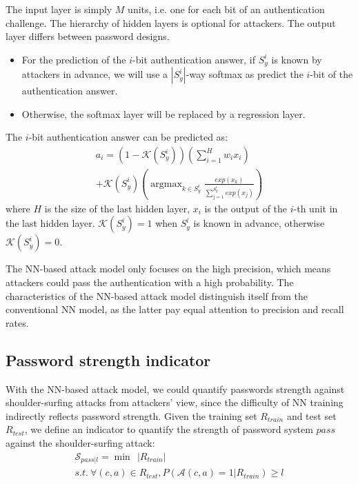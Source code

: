 \documentclass{article}
\begin{document}
The input layer is simply $M$ units, i.e. one for each bit of an authentication challenge. The hierarchy of hidden layers is optional for attackers. The output layer differs between password designs.
\begin{itemize} 
  \item For the prediction of the $i$-bit authentication answer, if $S_y^i$ is known by attackers in advance, we will use a $|S_y^i|$-way softmax as predict the $i$-bit
  of the authentication answer.
  \item Otherwise, the softmax layer will be replaced by a regression layer. 
\end{itemize}
  The $i$-bit
  authentication answer can be predicted as:
  \begin{equation}
    \begin{gathered}
    a_i = (1-\mathcal{K}(S_y^i))(\sum_{i=1}^H w_ix_i) \\
    +\mathcal{K} (S_y^i)(\mathop{\arg\max}_{k \in S_y^i}\frac{exp(x_k)}{\sum_{j=1}^{S_y^i}exp(x_j)})
    \end{gathered}
  \end{equation}
  where $H$ is the size of the last hidden layer, $x_i$ is the output of the $i$-th unit in the last hidden layer.
  $\mathcal{K}(S_y^i) = 1$ when $S_y^i$ is known in advance, otherwise $\mathcal{K}(S_y^i) = 0$.




The NN-based attack model only focuses on the high precision, which means attackers could pass the authentication with a high probability. The characteristics of the NN-based attack model distinguish itself from the conventional NN model, as the latter pay equal attention to precision and recall rates.

\subsection{Password strength indicator}
With the NN-based attack model, we could quantify passwords strength against shoulder-surfing attacks from attackers' view, since the difficulty of NN training indirectly reflects password strength. Given the training set $R_{train}$ and test set $R_{test}$, we define an indicator to quantify the strength of password system $pass$ against the shoulder-surfing attack:
  \begin{equation}
    \begin{gathered}
    \mathcal{S}_{pass|l} = \mathop{\min}\ \ |R_{train}| \\
    s.t.\
    \forall (c,a) \in R_{test}, P(\mathcal{A}(c,a)=1|R_{train}) \geq l
    \end{gathered}
  \label{equa:indictor}
  \end{equation}
\end{document}
